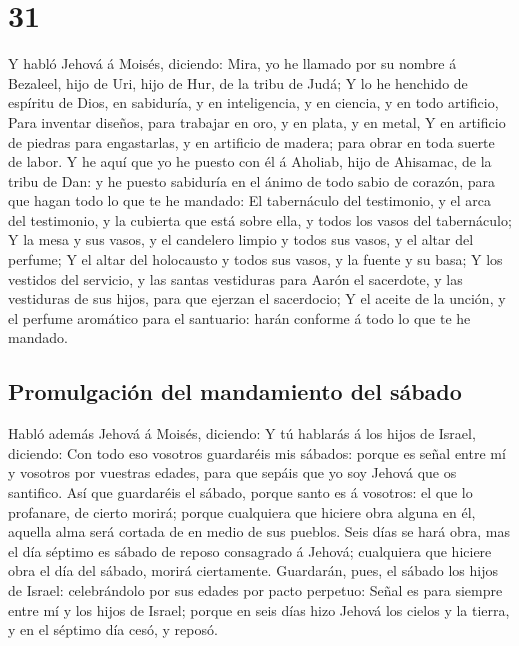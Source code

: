 \hypertarget{section-30}{%
\section{31}\label{section-30}}

 Y habló Jehová á Moisés, diciendo:  Mira,
yo he llamado por su nombre á Bezaleel, hijo de Uri, hijo de Hur, de la
tribu de Judá;  Y lo he henchido de espíritu de Dios, en
sabiduría, y en inteligencia, y en ciencia, y en todo artificio,
 Para inventar diseños, para trabajar en oro, y en plata,
y en metal,  Y en artificio de piedras para engastarlas, y
en artificio de madera; para obrar en toda suerte de labor.
 Y he aquí que yo he puesto con él á Aholiab, hijo de
Ahisamac, de la tribu de Dan: y he puesto sabiduría en el ánimo de todo
sabio de corazón, para que hagan todo lo que te he mandado:
 El tabernáculo del testimonio, y el arca del testimonio,
y la cubierta que está sobre ella, y todos los vasos del tabernáculo;
 Y la mesa y sus vasos, y el candelero limpio y todos sus
vasos, y el altar del perfume;  Y el altar del holocausto
y todos sus vasos, y la fuente y su basa;  Y los vestidos
del servicio, y las santas vestiduras para Aarón el sacerdote, y las
vestiduras de sus hijos, para que ejerzan el sacerdocio; 
Y el aceite de la unción, y el perfume aromático para el santuario:
harán conforme á todo lo que te he mandado.

\hypertarget{promulgaciuxf3n-del-mandamiento-del-suxe1bado}{%
\subsection{Promulgación del mandamiento del
sábado}\label{promulgaciuxf3n-del-mandamiento-del-suxe1bado}}

 Habló además Jehová á Moisés, diciendo: 
Y tú hablarás á los hijos de Israel, diciendo: Con todo eso vosotros
guardaréis mis sábados: porque es señal entre mí y vosotros por vuestras
edades, para que sepáis que yo soy Jehová que os santifico.
 Así que guardaréis el sábado, porque santo es á
vosotros: el que lo profanare, de cierto morirá; porque cualquiera que
hiciere obra alguna en él, aquella alma será cortada de en medio de sus
pueblos.  Seis días se hará obra, mas el día séptimo es
sábado de reposo consagrado á Jehová; cualquiera que hiciere obra el día
del sábado, morirá ciertamente.  Guardarán, pues, el
sábado los hijos de Israel: celebrándolo por sus edades por pacto
perpetuo:  Señal es para siempre entre mí y los hijos de
Israel; porque en seis días hizo Jehová los cielos y la tierra, y en el
séptimo día cesó, y reposó.

